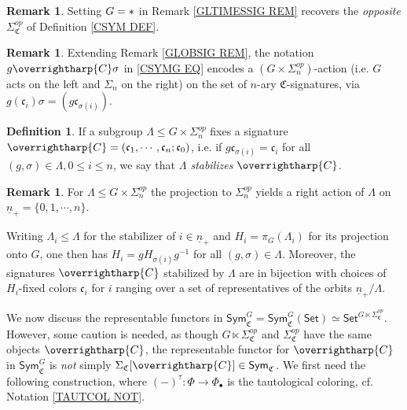 \documentclass[a4paper,10pt
,draft
]{article}%
\numberwithin{equation}{section}
\numberwithin{figure}{section}
\theoremstyle{definition} %
\newtheorem{definition}[equation]{Definition}%
\newtheorem{remark}[equation]{Remark}%
\newcommand{\vect}[1]{\text{\overrightharp{\ensuremath{#1}}}}
\newcommand{\1}{\ensuremath{\mathbbm 1}}%
\begin{document}
\begin{remark}
	Setting $G=\**$ in Remark \ref{GLTIMESSIG REM}
	recovers the \emph{opposite} 
	$\Sigma_{\mathfrak{C}}^{op}$ of 
	Definition \ref{CSYM DEF}.
\end{remark}


\begin{remark}\label{SIGACT REM}
	Extending Remark \ref{GLOBSIG REM}, 
	the notation $g \vect{C} \sigma$ in \eqref{CSYMG EQ}
	encodes a $(G \times \Sigma_n^{op})$-action
	(i.e. $G$ acts on the left and $\Sigma_n$ on the right)
	on the set of $n$-ary $\mathfrak{C}$-signatures,
	via
	$g(\mathfrak{c}_i)\sigma =
	(g\mathfrak{c}_{\sigma(i)})$.
\end{remark}


\begin{definition}\label{STABS DEF}
	If a subgroup $\Lambda \leq G \times \Sigma_n^{op}$
	fixes a signature 
	$\vect{C} = (\mathfrak{c}_1,\cdots,\mathfrak{c}_n;\mathfrak{c}_0)$,
	i.e. if
	$g\mathfrak{c}_{\sigma(i)} = \mathfrak{c}_i$
	for all $(g, \sigma) \in \Lambda, 0 \leq i \leq n$,
	we say that \textit{$\Lambda$ stabilizes $\vect C$}. 
\end{definition}


\begin{remark}\label{CHOOSESIGN REM}
	For $\Lambda \leq G \times \Sigma_n^{op}$ 
	the projection to $\Sigma_n^{op}$ yields a
	right action of $\Lambda$ on 
	$\underline{n}_+ = \{0,1,\cdots,n\}$.
	
	Writing $\Lambda_i\leq \Lambda$ for the stabilizer of $i \in \underline{n}_{+}$ and $H_i = \pi_G(\Lambda_i)$
	for its projection onto $G$,
	one then has $H_i = g H_{\sigma(i)} g^{-1}$ for all
	$(g, \sigma) \in \Lambda$.
%	
	Moreover, the signatures $\vect{C}$  
	stabilized by $\Lambda$ are in bijection with choices of 
	$H_i$-fixed colors $\mathfrak{c}_i$ 
	for $i$ ranging over a set of representatives of
	the orbits $\underline{n}_+ /\Lambda$.
\end{remark}



We now discuss the representable functors in 
$\mathsf{Sym}^G_{\mathfrak{C}} =
\mathsf{Sym}^G_{\mathfrak{C}}(\mathsf{Set}) \simeq 
\mathsf{Set}^{G \ltimes \Sigma^{op}_{\mathfrak{C}}}$.
However, some caution is needed,
as though $G \ltimes \Sigma^{op}_{\mathfrak{C}}$
and $\Sigma^{op}_{\mathfrak{C}}$
have the same objects $\vect{C}$,
the representable functor for $\vect{C}$ in
$\mathsf{Sym}^G_{\mathfrak{C}}$
is \emph{not} simply 
$\Sigma_{\mathfrak{C}}[\vect{C}]
\in \mathsf{Sym}_{\mathfrak{C}}$.
We first need the following construction,
where
$(-)^{\tau}\colon \Phi \to \Phi_{\bullet}$
is the tautological coloring, 
cf. Notation \ref{TAUTCOL NOT}.
\end{document}
